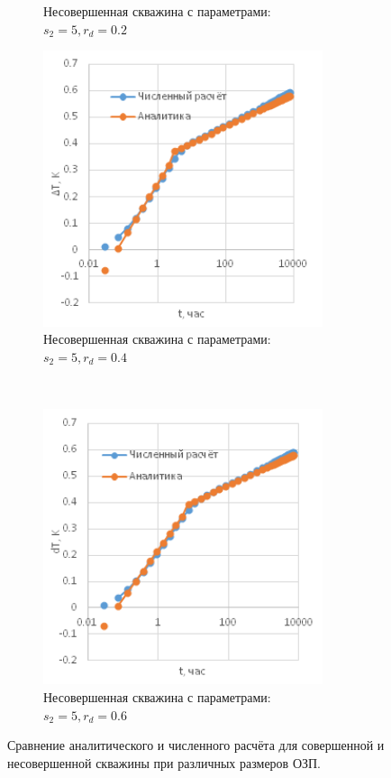 \begin{figure}[H]
\begin{subfigure}[b]{0.5\textwidth}
		\caption{Несовершенная скважина с параметрами: $s_2=5, r_d = 0.2$}
		\label{pic:imperf1}
	\end{subfigure}
	\begin{subfigure}[b]{0.5\textwidth}
		\centering
		\includegraphics[width=0.9\textwidth]{pic/imperf2.png}
		\caption{Несовершенная скважина с параметрами: $s_2=5, r_d = 0.4$}
		\label{pic:imperf2}
	\end{subfigure}
~
	\begin{subfigure}[b]{0.5\textwidth}
		\centering
		\includegraphics[width=0.9\textwidth]{pic/imperf3.png}
		\caption{Несовершенная скважина с параметрами: $s_2=5, r_d = 0.6$}
		\label{pic:imperf3}
	\end{subfigure}
	\caption{Сравнение аналитического и численного расчёта для совершенной и несовершенной скважины при различных размеров ОЗП.}
	\label{pic:analytic_cmp}
\end{figure}
